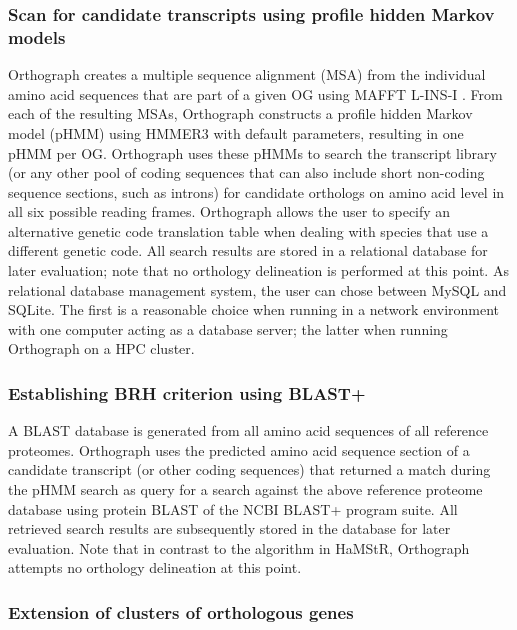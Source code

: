 \subsubsection{Scan for candidate transcripts using profile hidden
Markov
models}\label{scan-for-candidate-transcripts-using-profile-hidden-markov-models}

Orthograph creates a multiple sequence alignment (MSA) from the
individual amino acid sequences that are part of a given OG using MAFFT
L-INS-I \citep{Katoh2013}. From each of the resulting MSAs, Orthograph
constructs a profile hidden Markov model (pHMM) using HMMER3 with
default parameters, resulting in one pHMM per OG. Orthograph uses these
pHMMs to search the transcript library (or any other pool of coding
sequences that can also include short non-coding sequence sections, such
as introns) for candidate orthologs on amino acid level in all six
possible reading frames. Orthograph allows the user to specify an
alternative genetic code translation table when dealing with species
that use a different genetic code. All search results are stored in a
relational database for later evaluation; note that no orthology
delineation is performed at this point. As relational database
management system, the user can chose between MySQL and SQLite. The
first is a reasonable choice when running in a network environment with
one computer acting as a database server; the latter when running
Orthograph on a HPC cluster.

\subsubsection{Establishing BRH criterion using
BLAST+}\label{establishing-brh-criterion-using-blast}

A BLAST database is generated from all amino acid sequences of all
reference proteomes. Orthograph uses the predicted amino acid sequence
section of a candidate transcript (or other coding sequences) that
returned a match during the pHMM search as query for a search against
the above reference proteome database using protein BLAST of the NCBI
BLAST+ program suite. All retrieved search results are subsequently
stored in the database for later evaluation. Note that in contrast to
the algorithm in HaMStR, Orthograph attempts no orthology delineation at
this point.

\subsubsection{Extension of clusters of orthologous
genes}\label{extension-of-clusters-of-orthologous-genes}

